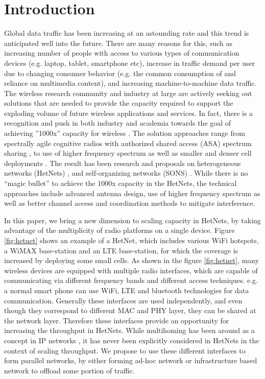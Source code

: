 \documentclass{sig-alternate-10pt}
\begin{document}


\section{Introduction}
Global data traffic has been increasing at an astounding rate and this trend is anticipated well into the future. There are many reasons for this,  such as increasing number of people with access to various types of  communication devices (e.g. laptop, tablet, smartphone etc), increase in traffic demand per user due to changing consumer behavior (e.g. the common consumption of and reliance on multimedia content), and increasing machine-to-machine data traffic. The wireless research community and industry at large are actively seeking out solutions that are needed to provide the capacity required to support the exploding volume of future wireless applications and services. In fact, there is a recognition and push in both industry and academia towards the goal of achieving ”1000x” capacity for wireless \cite{1000x, lte12bnsn, 1000xmeet}. The solution approaches range from spectrally agile cognitive radios with authorized shared access (ASA) spectrum sharing \cite{specsharing, 1000xmore}, to use of higher frequency spectrum \cite{current5G, rapp5g13} as well as smaller and denser cell deployments \cite{ping10femtoUL}. The result has been research and proposals on heterogeneous networks (HetNets) \cite{andrews13hetnets, andrews14load, zhang04madm}, and self-organizing networks (SONS) \cite{son4g, sohrabi99sensornet}. While there is no ``magic bullet'' to achieve the 1000x capacity in the HetNets, the technical approaches include advanced antenna design, use of higher frequency spectrum as well as better channel access and coordination methods to mitigate interference.  

In this paper, we bring a new dimension to scaling capacity in HetNets, by taking advantage of the multiplicity of radio platforms on a single device. Figure \ref{fig:hetnet} shows an example of a HetNet, which includes various WiFi hotspots, a WiMAX base-station and an LTE base-station, for which the coverage is increased by deploying some small cells.  As shown in the figure \ref{fig:hetnet}, many wireless devices are equipped with multiple radio interfaces, which are capable of communicating via different frequency bands and different access techniques. e.g. a normal smart phone can use WiFi, LTE and bluetooth technologies for data communication. Generally these interfaces are used independently, and even though they correspond to different MAC and  PHY layer,  they can be shared at the network layer. Therefore these interfaces provide an  opportunity for increasing the throughput  in HetNets. While multihoming has been around as a concept in IP networks \cite{Bu04multihoming,Sousa11multihoming}, it has never been explicitly considered in HetNets in the context of scaling throughput. We propose to use these different interfaces to form parallel networks, by either forming ad-hoc network or infrastructure based network to offload some portion of traffic. 
\end{document}
